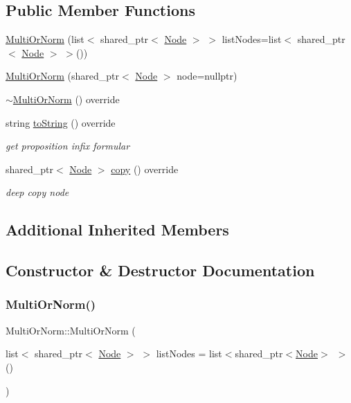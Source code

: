 \subsection*{Public Member Functions}
\begin{DoxyCompactItemize}
\item 
\hyperlink{class_multi_or_norm_ae11a281782c23c8a3675d6abc5b3bfbc}{Multi\+Or\+Norm} (list$<$ shared\+\_\+ptr$<$ \hyperlink{class_node}{Node} $>$ $>$ list\+Nodes=list$<$ shared\+\_\+ptr$<$ \hyperlink{class_node}{Node} $>$ $>$())
\item 
\hyperlink{class_multi_or_norm_a43f3ee64ab919f4c85ecdda2a92bef00}{Multi\+Or\+Norm} (shared\+\_\+ptr$<$ \hyperlink{class_node}{Node} $>$ node=nullptr)
\item 
\hyperlink{class_multi_or_norm_a8de0c4794574f93dd2131075943f4209}{$\sim$\+Multi\+Or\+Norm} () override
\item 
string \hyperlink{class_multi_or_norm_ad70e2ca31478183da21ee1995964c2c3}{to\+String} () override
\begin{DoxyCompactList}\small\item\em get proposition infix formular \end{DoxyCompactList}\item 
shared\+\_\+ptr$<$ \hyperlink{class_node}{Node} $>$ \hyperlink{class_multi_or_norm_a030bc7807678c834b467daa7a3a8dab5}{copy} () override
\begin{DoxyCompactList}\small\item\em deep copy node \end{DoxyCompactList}\end{DoxyCompactItemize}
\subsection*{Additional Inherited Members}


\subsection{Constructor \& Destructor Documentation}
\mbox{\label{class_multi_or_norm_ae11a281782c23c8a3675d6abc5b3bfbc}} 
\subsubsection{\texorpdfstring{Multi\+Or\+Norm()}{MultiOrNorm()}\hspace{0.1cm}{\footnotesize\ttfamily [1/2]}}
{\footnotesize\ttfamily Multi\+Or\+Norm\+::\+Multi\+Or\+Norm (\begin{DoxyParamCaption}\item[{list$<$ shared\+\_\+ptr$<$ \hyperlink{class_node}{Node} $>$ $>$}]{list\+Nodes = {\ttfamily list$<$shared\+\_\+ptr$<$\hyperlink{class_node}{Node}$>$~$>$()} }\end{DoxyParamCaption})\hspace{0.3cm}{\ttfamily [explicit]}}

